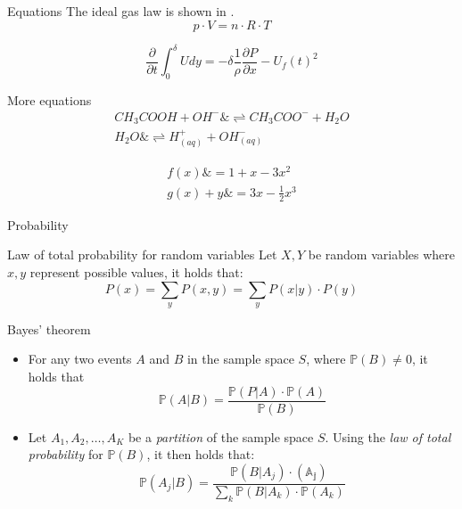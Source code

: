 \documentclass[aspectratio=169,hyperref={pdfpagelabels=false}]{beamer}
\begin{document}
\begin{frame}{Equations}
The ideal gas law is shown in .
\begin{equation}
    p \cdot V = n \cdot R \cdot T
\end{equation}

\begin{equation} \label{eq:IME}
    \frac{\partial}{\partial t} \int_{0}^{\delta} U dy = - \delta \frac{1}{\rho}\frac{\partial P}{\partial x}-U_f(t)^2
\end{equation}

\end{frame}

\begin{frame}{More equations}
\begin{equation}
\begin{aligned} 
    CH_3COOH + OH^{-} \&\rightleftharpoons CH_3COO^{-} + H_2O \\
    H_2O \&\rightleftharpoons H^{+}_{(aq)} + OH^{-}_{(aq)}
\end{aligned}
\end{equation}


\begin{align} 
    \label{eq:align1}     
    f(x) \&= 1 + x - 3 x^2 \\
    \label{eq:align2} 
    g(x) + y \&= 3x - \frac{1}{2} x^3 
\end{align}
\end{frame}

\begin{frame}[allowframebreaks]{Probability}
    \begin{block}{Law of total probability for random variables}
    Let \(X,Y\) be random variables where \(x,y\) represent possible values, it holds that:
    \[
        P(x) = \sum_y P(x,y) = \sum_y P(x|y)\cdot P(y)
    \]
    \end{block}
    \framebreak
    
    
    \begin{block}{Bayes' theorem}
    \begin{itemize}
        \item For any two events \(A\) and \(B\) in the sample space \(S\), where \(\mathds{P}(B) \neq 0\), it holds that
        \[\mathds{P}(A|B) = \frac{\mathds{P}(P|A) \cdot \mathds{P}(A)}{\mathds{P}(B)}\]
        \item Let \(A_1, A_2, \dots , A_K\) be a \textit{partition} of the sample space \(S\). Using the \textit{law of total probability} for \(\mathds{P}(B)\), it then holds that:
        \[
            \mathds{P}(A_j | B) = \frac{\mathds{P}(B|A_j) \cdot \mathds{(A_j)}}{\sum_k \mathds{P}(B|A_k) \cdot \mathds{P}(A_k)}
        \]
    \end{itemize}
    \end{block}
\end{frame}
\end{document}
